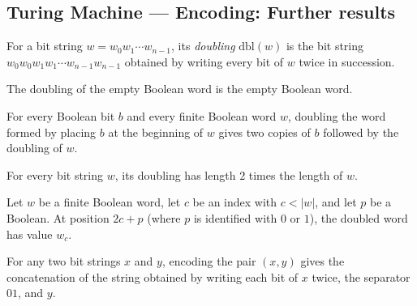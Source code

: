 \subsection*{Turing Machine --- Encoding: Further results}

\begin{definition}
\label{Turing.dbl}
\leanok
For a bit string $w = w_0 w_1 \cdots w_{n-1}$, its \emph{doubling}
$\mathrm{dbl}(w)$ is the bit string $w_0 w_0 w_1 w_1 \cdots w_{n-1} w_{n-1}$
obtained by writing every bit of $w$ twice in succession.
\end{definition}

\begin{lemma}
\label{Turing.dbl_nil}
\leanok
{}
The doubling of the empty Boolean word is the empty Boolean word.
\end{lemma}

\begin{lemma}
\label{Turing.dbl_cons}
\leanok
{}
For every Boolean bit $b$ and every finite Boolean word $w$, doubling the word formed by
placing $b$ at the beginning of $w$ gives two copies of $b$ followed by the doubling of
$w$.
\end{lemma}

\begin{lemma}
\label{Turing.length_dbl}
\leanok
{}
For every bit string $w$, its doubling has length $2$ times the length of $w$.
\end{lemma}

\begin{lemma}
\label{Turing.getElem?_dbl}
\leanok
{}
Let $w$ be a finite Boolean word, let $c$ be an index with $c<|w|$, and let $p$ be a
Boolean. At position $2c+p$ (where $p$ is identified with $0$ or $1$), the doubled word
has value $w_c$.
\end{lemma}

\begin{lemma}
\label{Turing.pairEncode_eq_dbl}
\leanok
{}
For any two bit strings $x$ and $y$, encoding the pair $(x,y)$ gives the concatenation
of the string obtained by writing each bit of $x$ twice, the separator $01$, and $y$.
\end{lemma}

